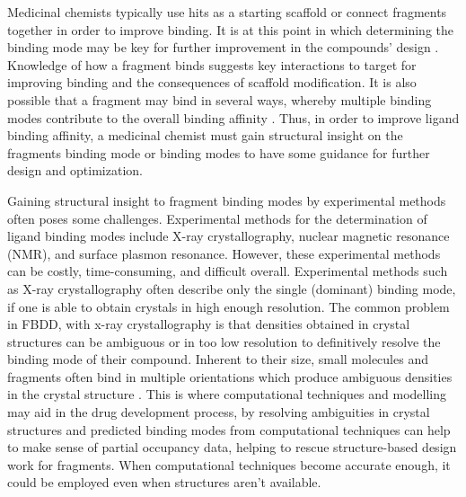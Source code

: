 \documentclass[journal=jcisd8,manuscript=article]{achemso}
\begin{document}
Medicinal chemists typically use hits as a starting scaffold or connect fragments together in order to improve binding.
It is at this point in which determining the binding mode may be key for further improvement in the compounds' design \cite{gozalbes_contributions_2010}. 
Knowledge of how a fragment binds suggests key interactions to target for  improving binding and the consequences of scaffold modification.
It is also possible that a fragment may bind in several ways, whereby multiple binding modes contribute to the overall binding affinity \cite{stjernschantz_improved_2010}. 
Thus, in order to improve ligand binding affinity, a medicinal chemist must gain structural insight on the fragments binding mode or binding modes to have some guidance for further design and optimization.

Gaining structural insight to fragment binding modes by experimental methods often poses some challenges. 
Experimental methods for the determination of ligand binding modes include X-ray crystallography, nuclear magnetic resonance (NMR), and surface plasmon resonance.
However, these experimental methods can be costly, time-consuming, and difficult overall\cite{jhoti_fragment-based_2007, gozalbes_contributions_2010}.
Experimental methods such as X-ray crystallography often describe only the single (dominant) binding mode, if one is able to obtain crystals in high enough resolution.
The common problem in FBDD, with x-ray crystallography is that densities obtained in crystal structures can be ambiguous or in too low resolution to definitively resolve the binding mode of their compound.
Inherent to their size, small molecules and fragments often bind in multiple orientations which produce ambiguous densities in the crystal structure \cite{domagalski_quality_2014}.
This is where computational techniques and modelling may aid in the drug development process, by resolving ambiguities in crystal structures and predicted binding modes from computational techniques can help to make sense of partial occupancy data, helping to rescue structure-based design work for fragments.
When computational techniques become accurate enough, it could be employed even when structures aren't available\cite{erlanson_introduction_2012}.
\end{document}
